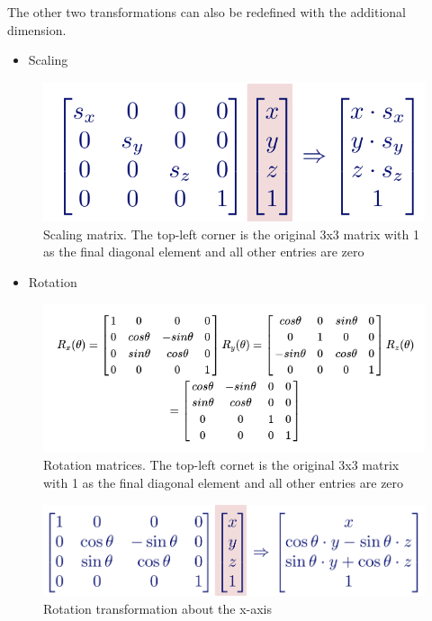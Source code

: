 \documentclass[
]{book}
\providecommand{\tightlist}{%
  \setlength{\itemsep}{0pt}\setlength{\parskip}{0pt}}
\begin{document}
The other two transformations can also be redefined with the additional dimension.

\begin{itemize}
\tightlist
\item
  Scaling
\end{itemize}

\begin{figure}
\centering
\includegraphics{img/08-image19.png}
\caption{\label{fig:scaling-unified-op}Scaling matrix. The top-left corner is the original 3x3 matrix with 1 as the final diagonal element and all other entries are zero}
\end{figure}

\begin{itemize}
\tightlist
\item
  Rotation
\end{itemize}

\begin{figure}
\centering
\includegraphics{img/08-image20.png}
\caption{\label{fig:rotate-unified-op}Rotation matrices. The top-left cornet is the original 3x3 matrix with 1 as the final diagonal element and all other entries are zero}
\end{figure}

\begin{figure}
\centering
\includegraphics{img/08-image21.png}
\caption{\label{fig:rotate-unified-x}Rotation transformation about the x-axis}
\end{figure}
\end{document}
